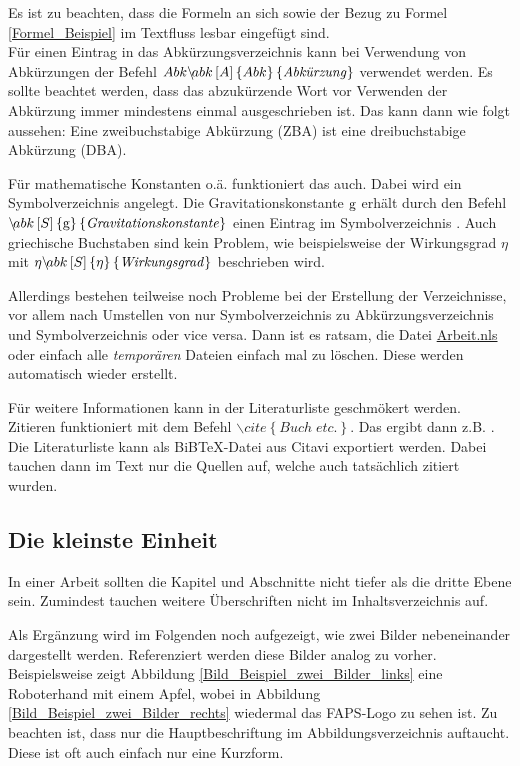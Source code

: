 Es ist zu beachten, dass die Formeln an sich sowie der Bezug zu Formel
\eqref{Formel_Beispiel} im Textfluss lesbar eingefügt sind.\\

Für einen Eintrag in das Abkürzungsverzeichnis kann bei Verwendung von
Abkürzungen der Befehl $Abk\backslash\!abk\left[A\right]\left\{ Abk
\right\}\left\{\text{\emph{Abkürzung}}\right\}$ verwendet werden. Es sollte
beachtet werden, dass das abzukürzende Wort vor Verwenden der Abkürzung immer
mindestens einmal ausgeschrieben ist.
Das kann dann wie folgt aussehen: Eine zweibuchstabige Abkürzung
(ZBA) ist eine dreibuchstabige Abkürzung
(DBA).

Für mathematische Konstanten o.ä. funktioniert das auch. Dabei wird ein
Symbolverzeichnis angelegt. Die Gravitationskonstante $\textnormal{g}$ erhält durch
den Befehl $ \backslash\!abk\left[S\right]\left\{ \textnormal{g}
\right\}\left\{\text{\emph{Gravitationskonstante}}\right\}$ einen Eintrag im Symbolverzeichnis . Auch griechische Buchstaben sind kein Problem, wie beispielsweise der Wirkungsgrad $\eta$ mit $\eta\backslash\!abk\left[S\right]\left\{ \eta \right\}\left\{\text{\emph{Wirkungsgrad}}\right\}$ beschrieben wird.

Allerdings bestehen teilweise noch Probleme bei der Erstellung der
Verzeichnisse, vor allem nach Umstellen von nur Symbolverzeichnis zu
Abkürzungsverzeichnis und Symbolverzeichnis oder vice versa. Dann ist es ratsam,
die Datei \url{Arbeit.nls} oder einfach alle \emph{temporären} Dateien einfach mal zu löschen. Diese werden automatisch wieder erstellt.

Für weitere Informationen kann in der Literaturliste geschmökert werden.
Zitieren funktioniert mit dem Befehl $\backslash\!cite\left\{ Buch\;etc.
\right\}$. Das ergibt dann z.B. \cite{Resetarics.2009}. Die Literaturliste kann als BiBTeX-Datei aus Citavi exportiert werden. Dabei tauchen dann im Text nur die Quellen auf, welche auch tatsächlich zitiert wurden.

\subsection{Die kleinste Einheit}
In einer Arbeit sollten die Kapitel und Abschnitte nicht tiefer als die dritte
Ebene sein. Zumindest tauchen weitere Überschriften nicht im Inhaltsverzeichnis auf.

Als Ergänzung wird im Folgenden noch aufgezeigt, wie zwei Bilder nebeneinander
dargestellt werden. Referenziert werden diese Bilder analog zu vorher. Beispielsweise zeigt Abbildung \ref{Bild_Beispiel_zwei_Bilder_links} eine Roboterhand mit einem Apfel, wobei in Abbildung \ref{Bild_Beispiel_zwei_Bilder_rechts} wiedermal das FAPS-Logo zu sehen ist. Zu beachten ist, dass nur die Hauptbeschriftung im Abbildungsverzeichnis auftaucht. Diese ist oft auch einfach nur eine Kurzform.

